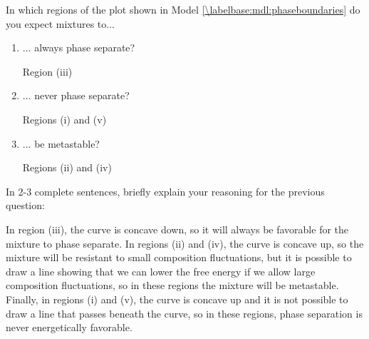 \begin{activity}
\begin{ctqs}
	\question In which regions of the plot shown in Model \ref{\labelbase:mdl:phaseboundaries} do you expect mixtures to...
		\begin{enumerate}
			\item ... always phase separate?
			
				\begin{solution}[0.5in]
				
					Region (iii)
				
				\end{solution}
			
			\item ... never phase separate?
			
				\begin{solution}[0.5in]
				
					Regions (i) and (v)
				
				\end{solution}
			
			\item ... be metastable?
			
				\begin{solution}[0.5in]
				
					Regions (ii) and (iv)
				
				\end{solution}
				
		\end{enumerate}
		
	\question In 2-3 complete sentences, briefly explain your reasoning for the previous question:
			
				\begin{solution}[2in]
				
					In region (iii), the curve is concave down, so it will always be favorable for the mixture to phase separate.  In regions (ii) and (iv), the curve is concave up, so the mixture will be resistant to small composition fluctuations, but it is possible to draw a line showing that we can lower the free energy if we allow large composition fluctuations, so in these regions the mixture will be metastable.  Finally, in regions (i) and (v), the curve is concave up and it is not possible to draw a line that passes beneath the curve, so in these regions, phase separation is never energetically favorable.
				
				\end{solution}
				
\end{ctqs}


\end{activity}
